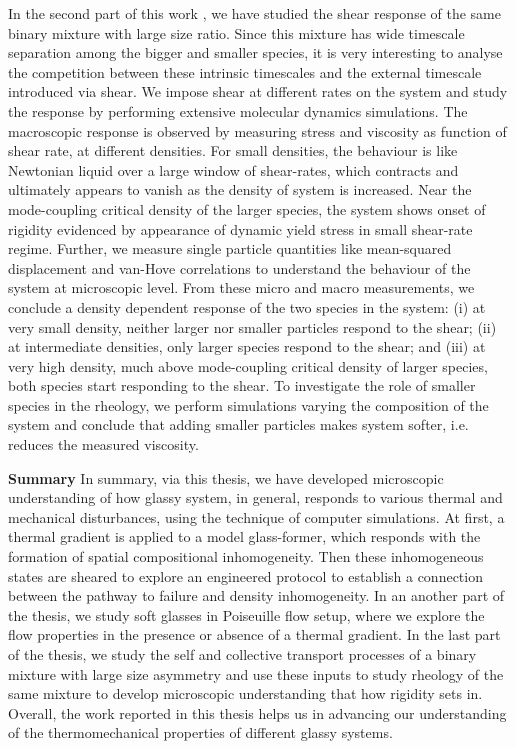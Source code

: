 In the second part of this work \cite{vaibhav2022rheological}, we have studied the shear response of the same binary mixture with large size ratio. Since this mixture has wide timescale separation among the bigger and smaller species, it is very interesting to analyse the competition between these intrinsic timescales and the external timescale introduced via shear. We  impose shear  at different rates on the system and study the response by performing extensive molecular dynamics simulations. The macroscopic response is observed by measuring stress and viscosity as function of shear rate, at different densities. For small densities, the behaviour is like Newtonian liquid over a large window of shear-rates, which contracts and ultimately appears to vanish as the density of system is increased. Near the mode-coupling critical density of the larger species, the system shows onset of rigidity evidenced by appearance of dynamic yield stress in small shear-rate regime. Further, we measure single particle quantities like mean-squared displacement and van-Hove correlations to understand the behaviour of the system at microscopic level. From these micro and macro measurements, we conclude a density dependent response of the two species in the system: (i) at very small density, neither larger nor smaller particles respond to the shear; (ii) at intermediate densities, only larger species respond to the shear; and (iii) at very high density, much above mode-coupling critical density of larger species, both species start responding to the shear. To investigate the role of smaller species in the rheology, we perform simulations varying the composition of the system and conclude that adding smaller particles makes system softer, i.e. reduces the measured viscosity.

\vskip 1.0cm
{\bf {\large Summary}}
\vskip 0.3cm
In summary, via this thesis, we have developed microscopic understanding of how glassy system, in general, responds to various thermal and mechanical disturbances, using the technique of computer simulations. At first, a thermal gradient is applied to a model glass-former, which responds with the formation of spatial compositional inhomogeneity. Then these inhomogeneous states are sheared to explore an engineered protocol to establish a connection between the pathway to failure and density inhomogeneity. In an another part of the thesis, we study soft glasses in Poiseuille flow setup, where we explore the flow properties in the presence or absence of a thermal gradient. In the last part of the thesis, we study the self and collective transport processes of a binary mixture with large size asymmetry and use these inputs to study rheology of the same mixture to develop microscopic understanding that how rigidity sets in.  Overall, the work reported in this thesis helps us in advancing our understanding of the thermomechanical properties of different glassy systems.

